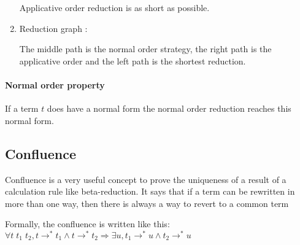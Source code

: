\begin{enumerate}
      Applicative order reduction is as short as possible.

    \item Reduction graph :
      \begin{center}
      \end{center}

      The middle path is the normal order strategy, the right path is the
      applicative order and the left path is the shortest reduction.
  \end{enumerate}

  \paragraph{Normal order property} If a term $t$ does have a normal form the
  normal order reduction reaches this normal form.

  \subsection{Confluence}

  Confluence is a very useful concept to prove the uniqueness of a result of
  a calculation rule like beta-reduction. It says that if a term can be
  rewritten in more than one way, then there is always a way to revert to a
  common term

  Formally, the confluence is written
  like this: $\forall t\; t_1\; t_2, t \to^* t_1 \wedge t \to^* t_2 \Rightarrow
  \exists u, t_1 \to^* u \wedge t_2 \to^* u$

